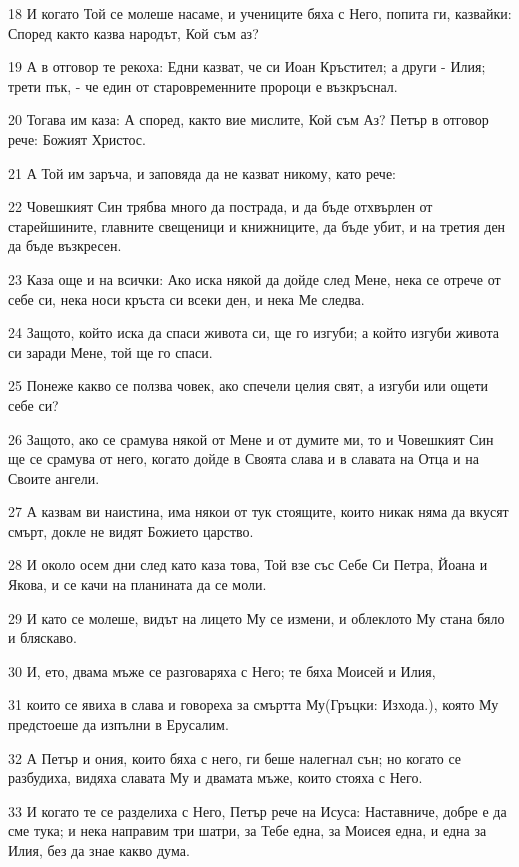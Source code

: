 \par 18 И когато Той се молеше насаме, и учениците бяха с Него, попита ги, казвайки: Според както казва народът, Кой съм аз?
\par 19 А в отговор те рекоха: Едни казват, че си Иоан Кръстител; а други - Илия; трети пък, - че един от старовременните пророци е възкръснал.
\par 20 Тогава им каза: А според, както вие мислите, Кой съм Аз? Петър в отговор рече: Божият Христос.
\par 21 А Той им заръча, и заповяда да не казват никому, като рече:
\par 22 Човешкият Син трябва много да пострада, и да бъде отхвърлен от старейшините, главните свещеници и книжниците, да бъде убит, и на третия ден да бъде възкресен.
\par 23 Каза още и на всички: Ако иска някой да дойде след Мене, нека се отрече от себе си, нека носи кръста си всеки ден, и нека Ме следва.
\par 24 Защото, който иска да спаси живота си, ще го изгуби; а който изгуби живота си заради Мене, той ще го спаси.
\par 25 Понеже какво се ползва човек, ако спечели целия свят, а изгуби или ощети себе си?
\par 26 Защото, ако се срамува някой от Мене и от думите ми, то и Човешкият Син ще се срамува от него, когато дойде в Своята слава и в славата на Отца и на Своите ангели.
\par 27 А казвам ви наистина, има някои от тук стоящите, които никак няма да вкусят смърт, докле не видят Божието царство.
\par 28 И около осем дни след като каза това, Той взе със Себе Си Петра, Йоана и Якова, и се качи на планината да се моли.
\par 29 И като се молеше, видът на лицето Му се измени, и облеклото Му стана бяло и бляскаво.
\par 30 И, ето, двама мъже се разговаряха с Него; те бяха Моисей и Илия,
\par 31 които се явиха в слава и говореха за смъртта Му(Гръцки: Изхода.), която Му предстоеше да изпълни в Ерусалим.
\par 32 А Петър и ония, които бяха с него, ги беше налегнал сън; но когато се разбудиха, видяха славата Му и двамата мъже, които стояха с Него.
\par 33 И когато те се разделиха с Него, Петър рече на Исуса: Наставниче, добре е да сме тука; и нека направим три шатри, за Тебе една, за Моисея една, и една за Илия, без да знае какво дума.
